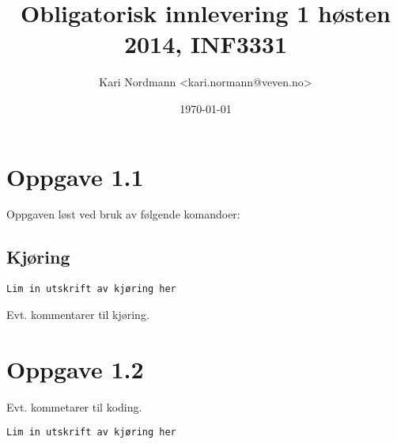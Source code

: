 \documentclass{article}
\title{Obligatorisk innlevering 1 høsten 2014, INF3331}
\author{Kari Nordmann <kari.normann@veven.no>}
\date{\today}
\begin{document}
\maketitle

\section*{Oppgave 1.1}

Oppgaven løst ved bruk av følgende komandoer:


\subsection*{Kjøring}
\begin{Verbatim}
Lim in utskrift av kjøring her
\end{Verbatim}

Evt. kommentarer til kjøring.

\section*{Oppgave 1.2}

Evt. kommetarer til koding.

\begin{Verbatim}
Lim in utskrift av kjøring her
\end{Verbatim}
\end{document}

